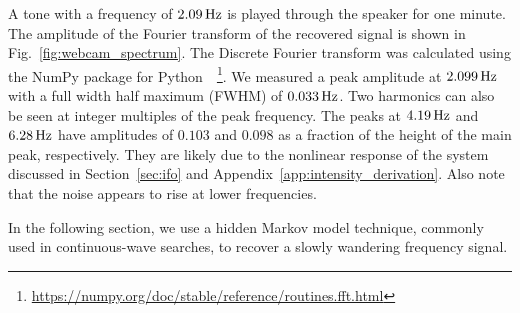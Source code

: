 \documentclass[paper-main.tex]{subfiles}
\begin{document}
A tone with a frequency of $2.09\,{\rm Hz}$ is played through the speaker for one minute. 
The amplitude of the Fourier transform of the recovered signal is shown in Fig.~\ref{fig:webcam_spectrum}. The Discrete Fourier transform was calculated using the NumPy package for Python~\cite{numpy}~\footnote{\url{https://numpy.org/doc/stable/reference/routines.fft.html}}.
We measured a peak amplitude at $2.099\,{\rm Hz}$ with a full width half maximum (FWHM) of $0.033\,{\rm Hz}$.
Two harmonics can also be seen at integer multiples of the peak frequency. 
The peaks at $4.19\,{\rm Hz}$ and $6.28\,{\rm Hz}$ have amplitudes of $0.103$ and $0.098$ as a fraction of the height of the main peak, respectively. They are likely due to the nonlinear response of the system discussed in Section~\ref{sec:ifo} and Appendix~\ref{app:intensity_derivation}. Also note that the noise appears to rise at lower frequencies.


In the following section, we use a hidden Markov model technique, commonly used in continuous-wave searches, to recover a slowly wandering frequency signal.
\end{document}

